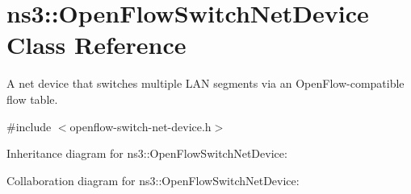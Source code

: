 \hypertarget{classns3_1_1OpenFlowSwitchNetDevice}{}\section{ns3\+:\+:Open\+Flow\+Switch\+Net\+Device Class Reference}
\label{classns3_1_1OpenFlowSwitchNetDevice}


A net device that switches multiple L\+AN segments via an Open\+Flow-\/compatible flow table.  




{\ttfamily \#include $<$openflow-\/switch-\/net-\/device.\+h$>$}



Inheritance diagram for ns3\+:\+:Open\+Flow\+Switch\+Net\+Device\+:


Collaboration diagram for ns3\+:\+:Open\+Flow\+Switch\+Net\+Device\+:
